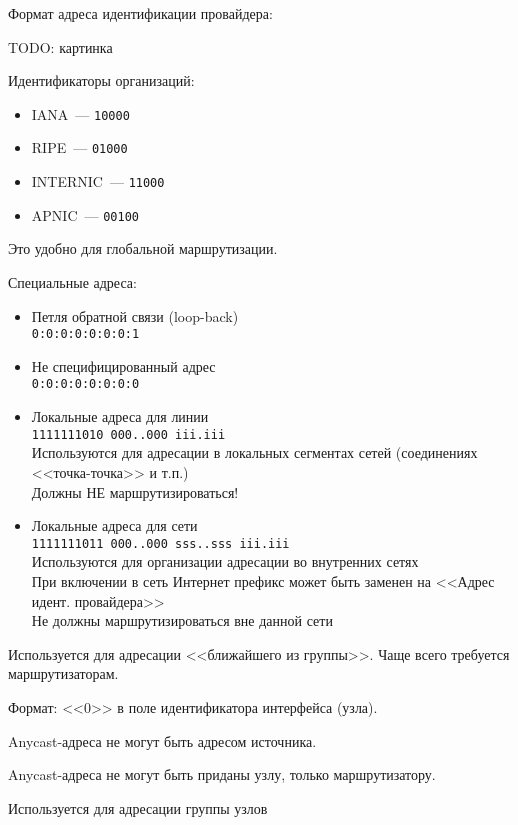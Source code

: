 Формат адреса идентификации провайдера:

TODO: картинка

Идентификаторы организаций:
\begin{itemize}
    \item IANA~--- {\tt 10000}
    \item RIPE~--- {\tt 01000}
    \item INTERNIC~--- {\tt 11000}
    \item APNIC~--- {\tt 00100}
\end{itemize}

Это удобно для глобальной маршрутизации.

Специальные адреса:
\begin{itemize}
    \item Петля обратной связи (loop-back)\\
    {\tt 0:0:0:0:0:0:0:1}
    \item Не специфицированный адрес\\
    {\tt 0:0:0:0:0:0:0:0}
    \item Локальные адреса для линии\\
    {\tt 1111111010 000..000 iii.iii}\\
    Используются для адресации в локальных сегментах сетей (соединениях <<точка-точка>> и т.п.)\\
    Должны НЕ маршрутизироваться!
    \item Локальные адреса для сети\\
    {\tt 1111111011 000..000 sss..sss iii.iii}\\
    Используются для организации адресации во внутренних сетях\\
    При включении в сеть Интернет префикс может быть заменен на <<Адрес идент. провайдера>>\\
    Не должны маршрутизироваться вне данной сети
\end{itemize}


Используется для адресации <<ближайшего из группы>>. Чаще всего требуется маршрутизаторам.

Формат: <<0>> в поле идентификатора интерфейса (узла).

Anycast-адреса не могут быть адресом источника.

Anycast-адреса не могут быть приданы узлу, только маршрутизатору.


Используется для адресации группы узлов

